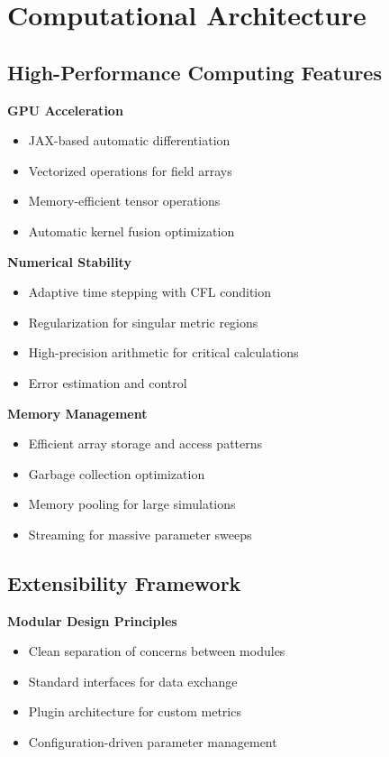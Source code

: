 \documentclass[11pt]{article}
\begin{document}
\section{Computational Architecture}

\subsection{High-Performance Computing Features}

\textbf{GPU Acceleration}
\begin{itemize}
\item JAX-based automatic differentiation
\item Vectorized operations for field arrays
\item Memory-efficient tensor operations
\item Automatic kernel fusion optimization
\end{itemize}

\textbf{Numerical Stability}
\begin{itemize}
\item Adaptive time stepping with CFL condition
\item Regularization for singular metric regions
\item High-precision arithmetic for critical calculations
\item Error estimation and control
\end{itemize}

\textbf{Memory Management}
\begin{itemize}
\item Efficient array storage and access patterns
\item Garbage collection optimization
\item Memory pooling for large simulations
\item Streaming for massive parameter sweeps
\end{itemize}

\subsection{Extensibility Framework}

\textbf{Modular Design Principles}
\begin{itemize}
\item Clean separation of concerns between modules
\item Standard interfaces for data exchange
\item Plugin architecture for custom metrics
\item Configuration-driven parameter management
\end{itemize}
\end{document}
